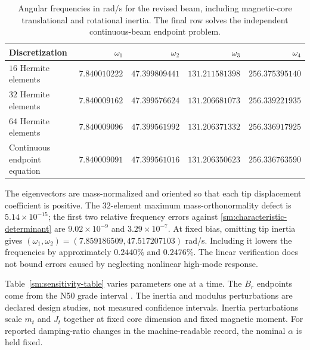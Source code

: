\begin{table}[t]
\centering\small
\caption{Angular frequencies in rad/s for the revised beam, including
magnetic-core translational and rotational inertia. The final row solves
the independent continuous-beam endpoint problem.}
\label{sm:frequency-table}
\begin{tabular}{lrrrr}
\toprule
Discretization & $\omega_1$ & $\omega_2$ & $\omega_3$ & $\omega_4$\\
\midrule
$16$ Hermite elements & $7.840010222$ & $47.399809441$ & $131.211581398$ & $256.375395140$\\
$32$ Hermite elements & $7.840009162$ & $47.399576624$ & $131.206681073$ & $256.339221935$\\
$64$ Hermite elements & $7.840009096$ & $47.399561992$ & $131.206371332$ & $256.336917925$\\
Continuous endpoint equation & $7.840009091$ & $47.399561016$ & $131.206350623$ & $256.336763590$\\
\bottomrule
\end{tabular}
\end{table}

The eigenvectors are mass-normalized and oriented so that each tip
displacement coefficient is positive. The $32$-element maximum
mass-orthonormality defect is $5.14\times10^{-15}$; the first two
relative frequency errors against \eqref{sm:characteristic-determinant}
are $9.02\times10^{-9}$ and $3.29\times10^{-7}$.
At fixed bias, omitting tip inertia gives
$(\omega_1,\omega_2)=(7.859186509,47.517207103)$ rad/s.
Including it lowers the frequencies by approximately $0.2440\%$ and
$0.2476\%$. The linear verification does not bound errors caused by
neglecting nonlinear high-mode response.

Table~\ref{sm:sensitivity-table} varies parameters one at a time.
The $B_r$ endpoints come from the N50 grade interval \citep{smN50}.
The inertia and modulus perturbations are declared design studies,
not measured confidence intervals. Inertia perturbations scale $m_t$
and $J_t$ together at fixed core dimension and fixed magnetic moment.
For reported damping-ratio changes in the machine-readable record,
the nominal $\alpha$ is held fixed.


